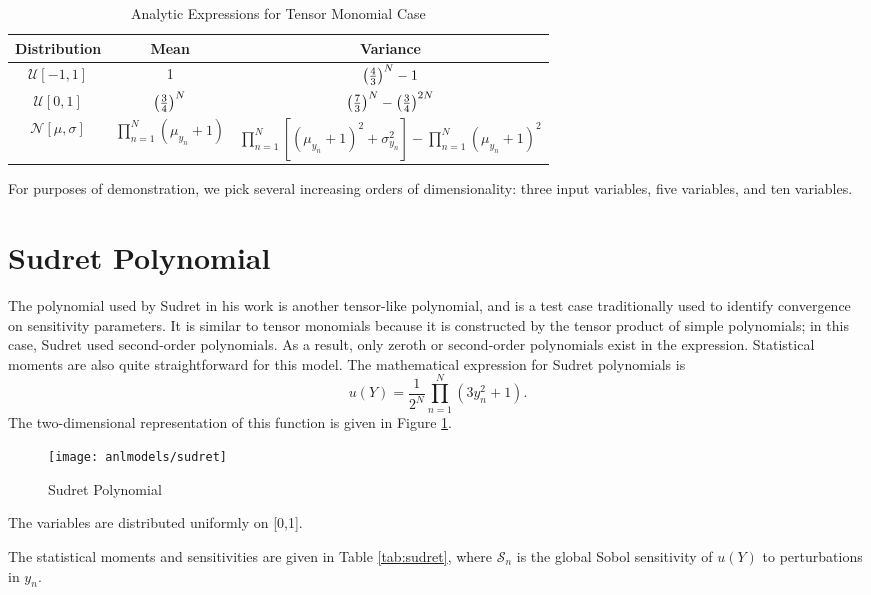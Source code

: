 \begin{table}[H]
  \centering
  \begin{tabular}{c|c|c}
    Distribution & Mean & Variance \\\hline
    $\mathcal{U}[-1,1]$ & 1 & $\qty(\frac{4}{3})^N - 1$ \\
    $\mathcal{U}[0,1]$ & $\qty(\frac{3}{4})^N$ & $\qty(\frac{7}{3})^N - \qty(\frac{3}{4})^{2N}$ \\
    $\mathcal{N}[\mu,\sigma]$ & $\prod_{n=1}^N (\mu_{y_n}+1)$ & $\prod_{n=1}^N[(\mu_{y_n}+1)^2+\sigma_{y_n}^2]
    - \prod_{n=1}^N (\mu_{y_n}+1)^2$
  \end{tabular}
  \caption{Analytic Expressions for Tensor Monomial Case}
  \label{tab:tensormono moments}
\end{table}
For purposes of demonstration, we pick several increasing orders of dimensionality: three input variables, five variables, and 
ten variables.

\section{Sudret Polynomial}\label{mod:sudret}
The polynomial used by Sudret in his work \cite{sudret} is another tensor-like polynomial, and is a test case traditionally used to
identify convergence on sensitivity parameters.  It is similar to tensor monomials because it is constructed by the tensor
product of simple polynomials; in this case, Sudret used second-order polynomials.  As a result, only zeroth or second-order
polynomials exist in the expression.  Statistical moments are also quite straightforward for this model.
The mathematical expression for Sudret polynomials is
\begin{equation}
  u(Y) = \frac{1}{2^N}\prod_{n=1}^N (3y_n^2+1).
\end{equation}
The two-dimensional representation of this function is given in Figure \ref{fig: sudret}.
\begin{figure}[htb]
  \centering
  \texttt{[image: anlmodels/sudret]}
  \caption{Sudret Polynomial}
  \label{fig: sudret}
\end{figure}
The variables are distributed uniformly on [0,1].

The statistical moments and sensitivities are given in
Table \ref{tab:sudret}, where $\mathcal{S}_n$ is the global Sobol sensitivity of $u(Y)$ to perturbations in
$y_n$.

